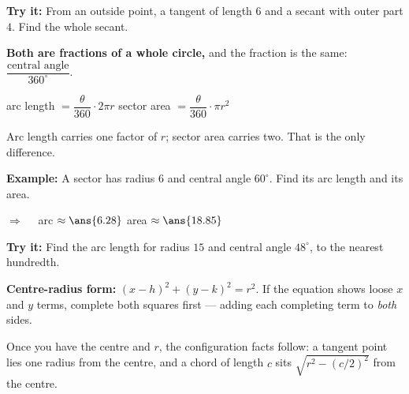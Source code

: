 \documentclass[12pt]{article}
\begin{document}
\begin{tryitbox}
\textbf{Try it:} \quad From an outside point, a tangent of length $6$ and a secant with outer part $4$. Find the whole secant.\\[2pt]
\end{tryitbox}


\begin{formulabox}
\textbf{Both are fractions of a whole circle,} and the fraction is the same: $\dfrac{\text{central angle}}{360^\circ}$.\par
arc length $= \dfrac{\theta}{360}\cdot 2\pi r$ \qquad sector area $= \dfrac{\theta}{360}\cdot \pi r^2$\par
Arc length carries one factor of $r$; sector area carries two. That is the only difference.
\end{formulabox}

\begin{examplebox}
\textbf{Example:} \quad A sector has radius $6$ and central angle $60^\circ$. Find its arc length and its area.

$\Rightarrow\quad$ arc $\approx \ans{6.28}$ \quad area $\approx \ans{18.85}$
\end{examplebox}

\begin{tryitbox}
\textbf{Try it:} \quad Find the arc length for radius $15$ and central angle $48^\circ$, to the nearest hundredth.\\[2pt]
\end{tryitbox}


\begin{formulabox}
\textbf{Centre-radius form:} $(x-h)^2 + (y-k)^2 = r^2$. If the equation shows loose $x$ and $y$ terms, complete both squares first --- adding each completing term to \emph{both} sides.\par
Once you have the centre and $r$, the configuration facts follow: a tangent point lies one radius from the centre, and a chord of length $c$ sits $\sqrt{r^2 - (c/2)^2}$ from the centre.
\end{formulabox}
\end{document}
